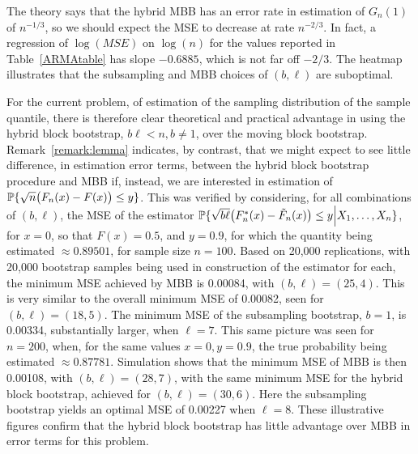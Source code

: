 \documentclass[a4paper, 12pt]{article}
\theoremstyle{plain}
\theoremstyle{definition}
\newcommand{\prob}{{\Bbb P}}
\begin{document}
The theory says that the hybrid MBB has an error rate in estimation of $G_n(1)$ of $n^{-1/3}$, so we should expect the MSE to decrease at rate $n^{-2/3}$. In fact, a regression of $\log(MSE)$ on $\log(n)$ for the values reported in Table~\ref{ARMAtable} has slope $-0.6885$, which is not far off $-2/3$. The heatmap illustrates that the subsampling and MBB choices of $(b,\ell)$ are suboptimal.

For the current problem, of estimation of the sampling distribution of the sample quantile, there is therefore clear theoretical and practical advantage in using the hybrid block bootstrap, $b \ell <n, b \neq 1$, over the moving block bootstrap. Remark~\ref{remark:lemma} indicates, by contrast, that we might expect to see little
difference, in estimation error terms, between the hybrid block bootstrap procedure and MBB if, instead, we are interested in estimation of $\prob\{\sqrt{n}\big(F_n(x)-{F}(x)\big)\le y \}$. This was verified by considering, for all combinations of $(b, \ell)$, the MSE of the estimator $\prob\{\sqrt{b\ell}\big(F^*_n(x)-\tilde{F}_n(x)\big)\le y\Big|X_1,\ldots,X_n\}$, for $x=0$, so that $F(x)=0.5$, and $y=0.9$, for which the quantity being estimated $\approx 0.89501$, for sample size $n=100$. Based on 20,000 replications, with 20,000 bootstrap samples being used in construction of the estimator for each, the minimum MSE achieved by MBB is 0.00084, with $(b, \ell)=(25,4)$. This is very similar to the overall minimum MSE of 0.00082, seen for $(b, \ell)=(18,5)$.  The minimum MSE of the subsampling bootstrap, $b=1$, is 0.00334, substantially larger, when $\ell=7$. This same picture was seen for $n=200$, when, for the same values $x=0, y=0.9$, the true probability being estimated $\approx 0.87781$. Simulation shows that the minimum MSE of MBB is then 0.00108, with $(b, \ell)=(28,7)$, with the same minimum MSE for the hybrid block bootstrap, achieved for $(b, \ell)=(30,6)$. Here the subsampling bootstrap yields an optimal MSE of 0.00227 when $\ell=8$. These illustrative figures confirm that the hybrid block bootstrap has little advantage over MBB in error terms for this problem.
\end{document}
